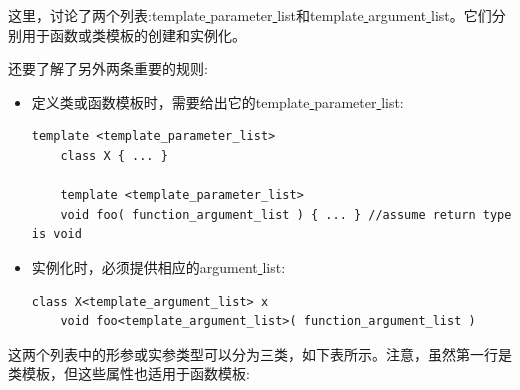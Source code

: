 这里，讨论了两个列表:template\underline{ }parameter\underline{ }list和template\underline{ }argument\underline{ }list。它们分别用于函数或类模板的创建和实例化。\par
还要了解了另外两条重要的规则: \par

\begin{itemize}
	\item 定义类或函数模板时，需要给出它的template\underline{ }parameter\underline{ }list:
	\begin{lstlisting}[caption={}]
	template <template_parameter_list>
	class X { ... }
	
	template <template_parameter_list>
	void foo( function_argument_list ) { ... } //assume return type is void
	\end{lstlisting}
	\item 实例化时，必须提供相应的argument\underline{ }list:
	\begin{lstlisting}[caption={}]
	class X<template_argument_list> x
	void foo<template_argument_list>( function_argument_list )
	\end{lstlisting}
\end{itemize}

这两个列表中的形参或实参类型可以分为三类，如下表所示。注意，虽然第一行是类模板，但这些属性也适用于函数模板: \par

